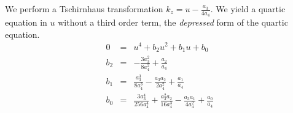 \documentclass[12pt,a4paper,twoside,openright,BCOR10mm,headsepline,titlepage,abstracton,chapterprefix,final]{scrreprt}
\newcommand\wavenumber{k}
\begin{document}
We perform a Tschirnhaus transformation $\wavenumber_z = u - \tfrac{a_3}{4 a_4}$. 
We yield a quartic equation in $u$ without a third order term, the \emph{depressed} form of the quartic equation.
\begin{eqnarray}
 0   &=& u^4 + b_2 u^2 + b_1 u + b_0 \\
 b_2 &=& -\frac{3 a_3^2}{8 a_4^2} + \frac{a_2}{a_4}\\
 b_1 &=& \frac{a_3^3}{8 a_4^3} - \frac{a_3 a_2}{2 a_4^2}+ \frac{a_1}{a_4}\\
 b_0 &=& \frac{3 a_3^4}{256 a_4^4} + \frac{a_3^2 a_2}{16 a_4^3}-\frac{a_3 a_1}{4 a_4^2} + \frac{a_0}{a_4}
\end{eqnarray}
\end{document}
